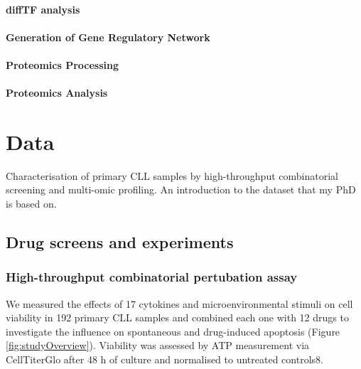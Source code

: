 \documentclass[11pt, a4paper, twosided]{book}
\begin{document}
\hypertarget{difftf-analysis}{%
\subsubsection{diffTF analysis}\label{difftf-analysis}}

\hypertarget{generation-of-gene-regulatory-network}{%
\subsubsection{Generation of Gene Regulatory Network}\label{generation-of-gene-regulatory-network}}

\hypertarget{proteomics-processing}{%
\subsubsection{Proteomics Processing}\label{proteomics-processing}}

\hypertarget{proteomics-analysis}{%
\subsubsection{Proteomics Analysis}\label{proteomics-analysis}}

\hypertarget{data}{%
\chapter{Data}\label{data}}

Characterisation of primary CLL samples by high-throughput combinatorial screening and multi-omic profiling. An introduction to the dataset that my PhD is based on.

\hypertarget{drug-screens-and-experiments}{%
\section{Drug screens and experiments}\label{drug-screens-and-experiments}}

\hypertarget{high-throughput-combinatorial-pertubation-assay}{%
\subsection{High-throughput combinatorial pertubation assay}\label{high-throughput-combinatorial-pertubation-assay}}

We measured the effects of 17 cytokines and microenvironmental stimuli on cell viability in 192 primary CLL samples and combined each one with 12 drugs to investigate the influence on spontaneous and drug-induced apoptosis (Figure \ref{fig:studyOverview}). Viability was assessed by ATP measurement via CellTiterGlo after 48 h of culture and normalised to untreated controls8.
\end{document}
